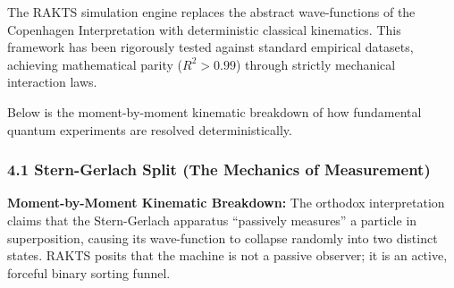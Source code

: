 \documentclass[
]{article}
\begin{document}
The RAKTS simulation engine replaces the abstract wave-functions of the
Copenhagen Interpretation with deterministic classical kinematics. This
framework has been rigorously tested against standard empirical
datasets, achieving mathematical parity (\(R^2 > 0.99\)) through
strictly mechanical interaction laws.

Below is the moment-by-moment kinematic breakdown of how fundamental
quantum experiments are resolved deterministically.

\subsubsection{4.1 Stern-Gerlach Split (The Mechanics of
Measurement)}\label{stern-gerlach-split-the-mechanics-of-measurement}

\textbf{Moment-by-Moment Kinematic Breakdown:} The orthodox
interpretation claims that the Stern-Gerlach apparatus ``passively
measures'' a particle in superposition, causing its wave-function to
collapse randomly into two distinct states. RAKTS posits that the
machine is not a passive observer; it is an active, forceful binary
sorting funnel.
\end{document}
